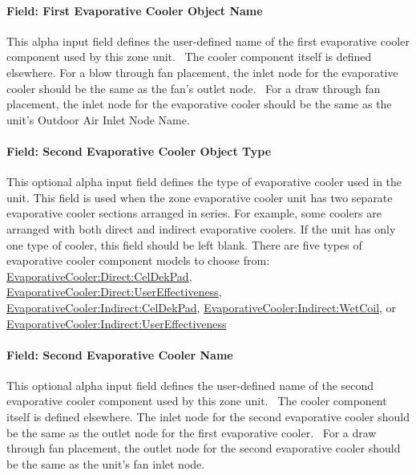 \paragraph{Field: First Evaporative Cooler Object Name}\label{field-first-evaporative-cooler-object-name}

This alpha input field defines the user-defined name of the first evaporative cooler component used by this zone unit.~ The cooler component itself is defined elsewhere. For a blow through fan placement, the inlet node for the evaporative cooler should be the same as the fan's outlet node.~ For a draw through fan placement, the inlet node for the evaporative cooler should be the same as the unit's Outdoor Air Inlet Node Name.

\paragraph{Field: Second Evaporative Cooler Object Type}\label{field-second-evaporative-cooler-object-type}

This optional alpha input field defines the type of evaporative cooler used in the unit. This field is used when the zone evaporative cooler unit has two separate evaporative cooler sections arranged in series. For example, some coolers are arranged with both direct and indirect evaporative coolers. If the unit has only one type of cooler, this field should be left blank. There are five types of evaporative cooler component models to choose from: \hyperref[evaporativecoolerdirectceldekpad]{EvaporativeCooler:Direct:CelDekPad}, \hyperref[evaporativecoolerdirectusereffectiveness]{EvaporativeCooler:Direct:UserEffectiveness}, \hyperref[evaporativecoolerindirectceldekpad]{EvaporativeCooler:Indirect:CelDekPad}, \hyperref[evaporativecoolerindirectwetcoil]{EvaporativeCooler:Indirect:WetCoil}, or \hyperref[evaporativecoolerindirectusereffectiveness]{EvaporativeCooler:Indirect:UserEffectiveness}

\paragraph{Field: Second Evaporative Cooler Name}\label{field-second-evaporative-cooler-name}

This optional alpha input field defines the user-defined name of the second evaporative cooler component used by this zone unit.~ The cooler component itself is defined elsewhere. The inlet node for the second evaporative cooler should be the same as the outlet node for the first evaporative cooler.~ For a draw through fan placement, the outlet node for the second evaporative cooler should be the same as the unit's fan inlet node.

